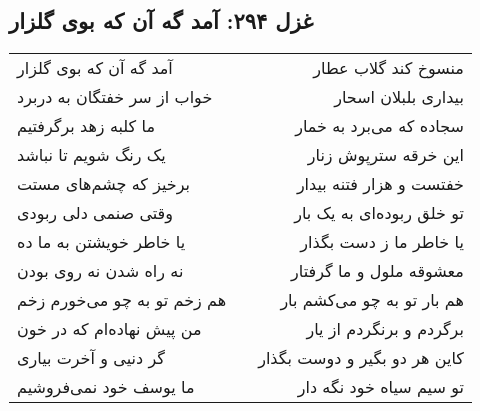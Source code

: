 \begin{center}
\section*{غزل ۲۹۴: آمد گه آن که بوی گلزار}
\label{sec:294}
\begin{longtable}{l p{0.5cm} r}
آمد گه آن که بوی گلزار
&&
منسوخ کند گلاب عطار
\\
خواب از سر خفتگان به دربرد
&&
بیداری بلبلان اسحار
\\
ما کلبه زهد برگرفتیم
&&
سجاده که می‌برد به خمار
\\
یک رنگ شویم تا نباشد
&&
این خرقه سترپوش زنار
\\
برخیز که چشم‌های مستت
&&
خفتست و هزار فتنه بیدار
\\
وقتی صنمی دلی ربودی
&&
تو خلق ربوده‌ای به یک بار
\\
یا خاطر خویشتن به ما ده
&&
یا خاطر ما ز دست بگذار
\\
نه راه شدن نه روی بودن
&&
معشوقه ملول و ما گرفتار
\\
هم زخم تو به چو می‌خورم زخم
&&
هم بار تو به چو می‌کشم بار
\\
من پیش نهاده‌ام که در خون
&&
برگردم و برنگردم از یار
\\
گر دنیی و آخرت بیاری
&&
کاین هر دو بگیر و دوست بگذار
\\
ما یوسف خود نمی‌فروشیم
&&
تو سیم سیاه خود نگه دار
\\
\end{longtable}
\end{center}
